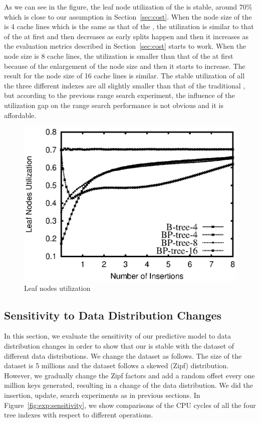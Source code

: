 As we can see in the figure, the leaf node utilization of the \bplustree is
stable, around 70\% which is close to our assumption in
Section~\ref{sec:cost}. When the node size of the \bptree is 4
cache lines which is the same as that of the \bplustree, the
utilization is similar to that of the \bplustree at first and then
decreases as early splits happen and then it increases as the
evaluation metrics described in Section~\ref{sec:cost} starts to
work. When the node size is 8 cache lines, the utilization is
smaller than that of the \bplustree at first because of the enlargement of
the node size and then it starts to increase. The result for the
node size of 16 cache lines is similar. The stable utilization of
all the three different \bptree indexes are all slightly smaller
than that of the traditional \bplustree, but according to the
previous range search experiment, the influence of the utilization
gap on the range search performance is not obvious and it is affordable.

\begin{figure}[!t]
\centering
\includegraphics[scale = 0.65] {figs/zipf_result5.eps}

\caption{Leaf nodes utilization} \label{fig:exp:utilization}
\end{figure}

\subsection{Sensitivity to Data Distribution Changes}
In this section, we evaluate the sensitivity of our predictive
model to data distribution changes in order to show that our \bptree is stable
with the dataset of different data distributions. We change the dataset as
follows. The size of the dataset is 5 millions and the dataset follows
a skewed (Zipf) distribution. However, we gradually change the Zipf factors and
add a random offset every one million keys generated,
resulting in a change of the data distribution. We did
the insertion, update, search experiments as in previous sections.
In Figure~\ref{fig:exp:sensitivity}, we show comparisons of the
CPU cycles of all the four tree indexes with respect to different
operations.


